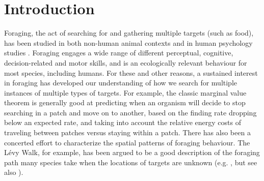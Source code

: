 \documentclass[preprints, article,submit,pdftex,moreauthors]{Definitions/mdpi}
\begin{document}



\section{Introduction}

Foraging, the act of searching for and gathering multiple targets (such as food), has been studied in both non-human animal contexts \cite{dawkins1971} and in human psychology studies \cite{kristjansson2014}. Foraging engages a wide range of different perceptual, cognitive, decision-related and motor skills, and is an ecologically relevant behaviour for most species, including humans. For these and other reasons, a sustained interest in foraging has developed our understanding of how we search for multiple instances of multiple types of targets. For example, the classic marginal value theorem \cite {charnov1976} is generally good at predicting when an organism will decide to stop searching in a patch and move on to another, based on the finding rate dropping below an expected rate, and taking into account the relative energy costs of traveling between patches versus staying within a patch. There has also been a concerted effort to characterize the spatial patterns of foraging behaviour. The Lévy Walk, for example, has been argued to be a good description of the foraging path many species take when the locations of targets are unknown (e.g. \citep {bartumeus2005}, but see also \citep{benhamou2007}). 
\end{document}
